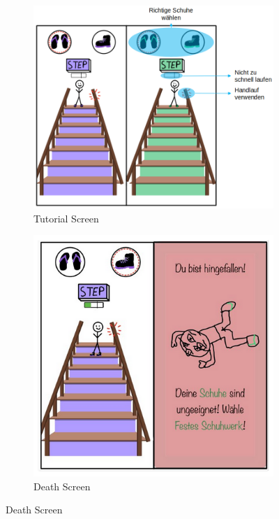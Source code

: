 \documentclass{article}
\begin{document}
\pagebreak

\begin{figure}[H]
    \centering
    \begin{subfigure}[t]{0.45\textwidth}
        \centering
        \includegraphics[width=\textwidth]{./resources/StairMaster_1.png}
        \caption{Tutorial Screen}
    \end{subfigure}
    \hfill
    \begin{subfigure}[t]{0.45\textwidth}
        \centering
        \includegraphics[width=\textwidth]{./resources/StairMaster_2.png}
        \caption{Death Screen}
    \end{subfigure}


\end{figure}
\end{document}
